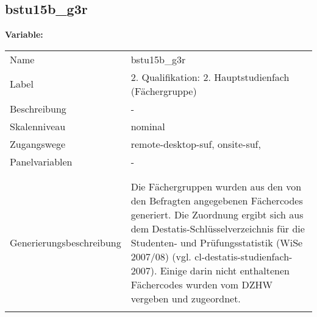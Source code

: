 	
	
	\subsection{bstu15b\_g3r}
	\label{subSection:bstu15b_g3r}

	\noindent\textbf{Variable:}\\
		\begin{tabular}{lL{11.3cm}}
			\label{tableVariable:bstu15b_g3r}
			Name & bstu15b\_g3r \\
			Label & 2. Qualifikation: 2. Hauptstudienfach (Fächergruppe) \\
			Beschreibung & - \\
			Skalenniveau & nominal \\
			Zugangswege &
				remote-desktop-suf,
				onsite-suf,
 \\
			Panelvariablen & -
			 \\
			 \\
 \\
					Generierungsbeschreibung & Die Fächergruppen wurden aus den von den Befragten angegebenen Fächercodes generiert. Die Zuordnung ergibt sich aus dem Destatis-Schlüsselverzeichnis für die Studenten- und Prüfungsstatistik (WiSe 2007/08) (vgl. cl-destatis-studienfach-2007).  Einige darin nicht enthaltenen Fächercodes wurden vom DZHW vergeben und zugeordnet. 
				 \\	
			 \\
		\end{tabular}






